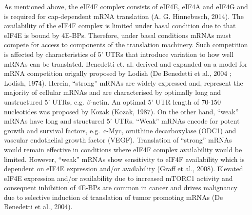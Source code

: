\documentclass[12pt,openany]{book}
\begin{document}
As mentioned above, the eIF4F complex consists of eIF4E, eIF4A and eIF4G
and is required for cap-dependent mRNA translation (A. G. Hinnebusch,
2014). The availability of the eIF4F complex is limited under basal
condition due to that eIF4E is bound by 4E-BPs. Therefore, under basal
conditions mRNAs must compete for access to components of the
translation machinery. Such competition is affected by characteristics
of 5' UTRs that introduce variation to how well mRNAs can be translated.
Benedetti et. al. derived and expanded on a model for mRNA competition
origally proposed by Lodish (De Benedetti et al., 2004 ; Lodish, 1974).
Herein, ``strong'' mRNAs are widely expressed and, represent the
majority of cellular mRNAs and are characterised by optimally long and
unstructured 5' UTRs, e.g. \(\beta\)-actin. An optimal 5' UTR length of
70-150 nucleotides was proposed by Kozak (Kozak, 1987). On the other
hand, ``weak'' mRNAs have long and structured 5' UTRs. ``Weak'' mRNAs
encode for potent growth and survival factors, e.g.~c-Myc, ornithine
decarboxylase (ODC1) and vascular endothelial growth factor (VEGF).
Translation of ``strong'' mRNAs would remain effective in conditions
where eIF4F complex availability would be limited. However, ``weak''
mRNAs show sensitivity to eIF4F availability which is dependent on eIF4E
expression and/or availability (Graff et al., 2008). Elevated eIF4E
expression and/or availability due to increased mTORC1 activity and
consequent inhibition of 4E-BPs are common in cancer and drives
malignancy due to selective induction of translation of tumor promoting
mRNAs (De Benedetti et al., 2004).
\end{document}
